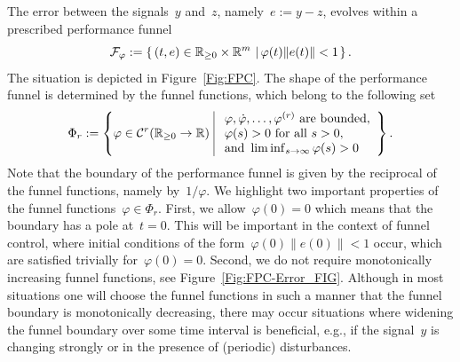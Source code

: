 \documentclass[ envcountsect, envcountsame]{svjour3}
\newcommand{\setdef}[2]{\left\{\, #1\, \left|\, \vphantom{#1} #2 \right.\right\}}
\newcommand{\R}{\mathbb{R}}
\newcommand{\cC}{\mathcal{C}}
\newcommand{\cF}{\mathcal{F}}
\newcommand{\vp}{\varphi}
\newcommand{\rp}{\mathbb{R}_{\geq 0}}
\begin{document}
%
%
The error between the signals~$y$ and~$z$, namely~$e := y-z$, evolves within a prescribed performance funnel
\begin{equation*}
\cF_\vp := \setdef{ (t,e) \in \rp \times \R^{m} }{ \vp(t) \|e(t)\| < 1}.
\end{equation*}
%
The situation is depicted in Figure~\ref{Fig:FPC}.
%
The shape of the performance funnel is determined by the funnel functions, which belong to the following set
\begin{equation*}
\Phi_r :=
\left\{
\vp \in \cC^r(\rp \to \R) \ \vline \ \begin{array}{l}
\vp, \dot \vp,\ldots,\vp^{(r)} \text{ are bounded}, \\ 
\vp(s) > 0 \text{ for all } s > 0, \\
\text{and } \liminf_{s \to \infty} \vp(s) > 0
\end{array}
\right\}.
\end{equation*}
%
%
Note that the boundary of the performance funnel is given by the reciprocal of the funnel functions, namely by~$1/\vp$. 
We highlight two important properties of the funnel functions~$\vp \in \Phi_r$. 
First, we allow~$\vp(0) = 0$ which means that the boundary has a pole at~$t=0$. This will be important in the context of funnel control, where initial conditions of the form~$\vp(0) \|e(0)\|<1$ occur, which are satisfied trivially for~$\vp(0)=0$.
Second, we do not require monotonically increasing funnel functions, see Figure~\ref{Fig:FPC-Error_FIG}. 
Although in most situations one will choose the funnel functions in such a manner that the funnel boundary is monotonically decreasing, there may occur situations where widening the funnel boundary over some time interval is beneficial, e.g., if the signal~$y$ is changing strongly or in the presence of (periodic) disturbances. 
%
\end{document}
